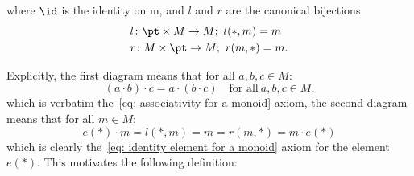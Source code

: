 where $\id$ is the identity on m, and $l$ and $r$ are the canonical bijections
\begin{align*}
    &l \colon \pt \times M \to M;\ l(\ast,m) = m \\
    &r \colon M \times \pt \to M;\ r(m,\ast) = m.
\end{align*}

Explicitly, the first diagram means that for all $a,b,c \in M$:
\[
    (a \cdot b) \cdot c = a \cdot (b \cdot c) 
    \quad \text{for all} \ a,b,c \in M.
\]
which is verbatim the~\ref{eq: associativity for a monoid} axiom, the second diagram means that for all $m \in M$:
\[
  e(\ast) \cdot m = l(\ast,m) = m = r(m,\ast) = m \cdot e(\ast)  
\]
which is clearly the~\ref{eq: identity element for a monoid} axiom 
for the element $e(\ast)$.
This motivates the following definition: 
